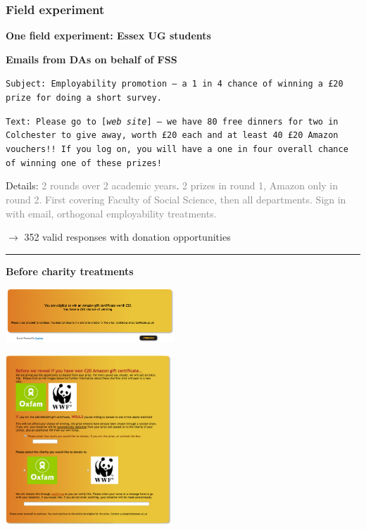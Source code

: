 \documentclass[]{article}
\begin{document}
\hypertarget{field-experiment}{%
\subsubsection{Field experiment}\label{field-experiment}}

\textbf{One field experiment: Essex UG students}

\bigskip

\textbf{Emails from DAs on behalf of FSS}

\texttt{\footnotesize Subject: Employability promotion -- a 1 in 4 chance of winning a £20 prize for doing a short survey.}
\bigskip

\texttt{\footnotesize Text: Please go to [\emph{web site}] --  we have 80 free dinners for two in Colchester to give away, worth £20 each and at least 40 £20 Amazon vouchers!! If you log on, you will have a one in four overall chance of winning one of these prizes!}

\bigskip

Details: \textcolor{gray}{2 rounds over 2 academic years}.
\textcolor{gray}{2 prizes in round 1, Amazon  only in round 2.}
\textcolor{gray}{First covering Faculty of Social Science, then all departments.}
\textcolor{gray}{Sign in with email, orthogonal employability treatments.}

\(\rightarrow\) 352 valid responses with donation opportunities

\begin{center}\rule{0.5\linewidth}{\linethickness}\end{center}

\textbf{Before charity treatments}

\includegraphics[width=2.5in]{picsfigs/eligibleforamazon.png}

\includegraphics[height=2.5in]{picsfigs/beforeamazon.png}
\end{document}
